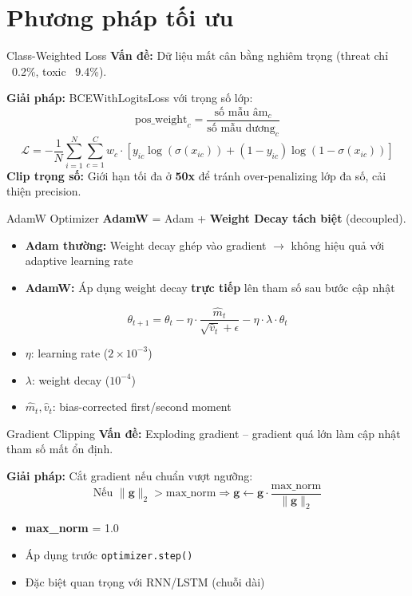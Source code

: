 \documentclass[serif, aspectratio=169]{beamer}
\begin{document}
\section{Phương pháp tối ưu}

\begin{frame}{Class-Weighted Loss}
\textbf{Vấn đề:} Dữ liệu mất cân bằng nghiêm trọng (threat chỉ ~0.2\%, toxic ~9.4\%).

\vspace{0.3cm}
\textbf{Giải pháp:} BCEWithLogitsLoss với trọng số lớp:
\[
\text{pos\_weight}_c = \frac{\text{số mẫu âm}_c}{\text{số mẫu dương}_c}
\]
\[
\mathcal{L} = -\frac{1}{N} \sum_{i=1}^{N} \sum_{c=1}^{C} w_c \cdot [y_{ic} \log(\sigma(x_{ic})) + (1-y_{ic}) \log(1-\sigma(x_{ic}))]
\]
\vspace{0.2cm}
\textbf{Clip trọng số:} Giới hạn tối đa ở \textbf{50x} để tránh over-penalizing lớp đa số, cải thiện precision.
\end{frame}

\begin{frame}{AdamW Optimizer}
\textbf{AdamW} = Adam + \textbf{Weight Decay tách biệt} (decoupled).

\vspace{0.3cm}
\begin{itemize}
    \item \textbf{Adam thường:} Weight decay ghép vào gradient $\rightarrow$ không hiệu quả với adaptive learning rate
    \item \textbf{AdamW:} Áp dụng weight decay \textbf{trực tiếp} lên tham số sau bước cập nhật
\end{itemize}
\vspace{0.3cm}
\[
\theta_{t+1} = \theta_t - \eta \cdot \frac{\hat{m}_t}{\sqrt{\hat{v}_t} + \epsilon} - \eta \cdot \lambda \cdot \theta_t
\]
\vspace{0.2cm}
\begin{itemize}
    \item $\eta$: learning rate ($2 \times 10^{-3}$)
    \item $\lambda$: weight decay ($10^{-4}$)
    \item $\hat{m}_t, \hat{v}_t$: bias-corrected first/second moment
\end{itemize}
\end{frame}

\begin{frame}{Gradient Clipping}
\textbf{Vấn đề:} Exploding gradient -- gradient quá lớn làm cập nhật tham số mất ổn định.

\vspace{0.3cm}
\textbf{Giải pháp:} Cắt gradient nếu chuẩn vượt ngưỡng:
\[
\text{Nếu } \|\mathbf{g}\|_2 > \text{max\_norm} \Rightarrow \mathbf{g} \leftarrow \mathbf{g} \cdot \frac{\text{max\_norm}}{\|\mathbf{g}\|_2}
\]
\vspace{0.2cm}
\begin{itemize}
    \item \textbf{max\_norm} = 1.0
    \item Áp dụng trước \texttt{optimizer.step()}
    \item Đặc biệt quan trọng với RNN/LSTM (chuỗi dài)
\end{itemize}
\end{frame}
\end{document}
